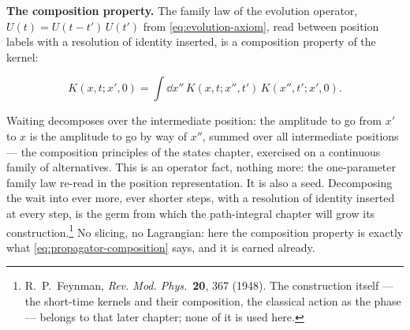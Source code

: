 \medskip\noindent\textbf{The composition property.} The family law of the evolution operator, $U(t) = U(t - t')\,U(t')$ from \eqref{eq:evolution-axiom}, read between position labels with a resolution of identity inserted, is a composition property of the kernel:
\begin{linenomath}
    \begin{equation}
        K(x, t; x', 0) = \int\!\dd x''\,K(x, t; x'', t')\,K(x'', t'; x', 0) .
        \label{eq:propagator-composition}
    \end{equation}
\end{linenomath}
Waiting decomposes over the intermediate position: the amplitude to go from $x'$ to $x$ is the amplitude to go by way of $x''$, summed over all intermediate positions --- the composition principles of the states chapter, exercised on a continuous family of alternatives. This is an operator fact, nothing more: the one-parameter family law re-read in the position representation. It is also a seed. Decomposing the wait into ever more, ever shorter steps, with a resolution of identity inserted at every step, is the germ from which the path-integral chapter will grow its construction.\footnote{R.~P.~Feynman, \emph{Rev. Mod. Phys.}~\textbf{20}, 367 (1948). The construction itself --- the short-time kernels and their composition, the classical action as the phase --- belongs to that later chapter; none of it is used here.} No slicing, no Lagrangian: here the composition property is exactly what \eqref{eq:propagator-composition} says, and it is earned already.


